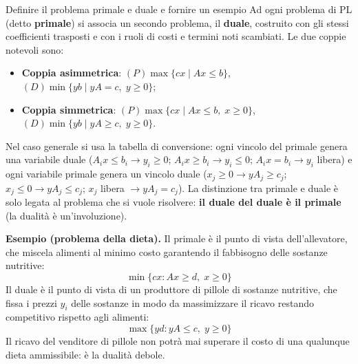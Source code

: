 \documentclass[12pt]{extarticle} %
\begin{document}
\begin{teoriabox}{Definire il problema primale e duale e fornire un esempio}
Ad ogni problema di PL (detto \textbf{primale}) si associa un secondo problema, il \textbf{duale}, costruito con gli stessi coefficienti trasposti e con i ruoli di costi e termini noti scambiati. Le due coppie notevoli sono:
\begin{itemize}
    \item \textbf{Coppia asimmetrica}: $(P) \max\{cx \mid Ax \le b\}$, $(D) \min\{yb \mid yA = c, \; y \ge 0\}$;
    \item \textbf{Coppia simmetrica}: $(P) \max\{cx \mid Ax \le b, \; x\ge 0\}$, $(D) \min\{yb \mid yA \ge c, \; y \ge 0\}$.
\end{itemize}
Nel caso generale si usa la tabella di conversione: ogni vincolo del primale genera una variabile duale ($A_ix \le b_i \to y_i \ge 0$; $A_ix \ge b_i \to y_i \le 0$; $A_ix = b_i \to y_i$ libera) e ogni variabile primale genera un vincolo duale ($x_j \ge 0 \to yA_j \ge c_j$; $x_j \le 0 \to yA_j \le c_j$; $x_j$ libera $\to yA_j = c_j$). La distinzione tra primale e duale è solo legata al problema che si vuole risolvere: \textbf{il duale del duale è il primale} (la dualità è un'involuzione).

\noindent\textbf{Esempio (problema della dieta).} Il primale è il punto di vista dell'allevatore, che miscela alimenti al minimo costo garantendo il fabbisogno delle sostanze nutritive:
\[
\min\{cx : Ax \ge d, \; x \ge 0\}
\]
Il duale è il punto di vista di un produttore di pillole di sostanze nutritive, che fissa i prezzi $y_i$ delle sostanze in modo da massimizzare il ricavo restando competitivo rispetto agli alimenti:
\[
\max\{yd : yA \le c, \; y \ge 0\}
\]
Il ricavo del venditore di pillole non potrà mai superare il costo di una qualunque dieta ammissibile: è la dualità debole.
\end{teoriabox}
\end{document}
